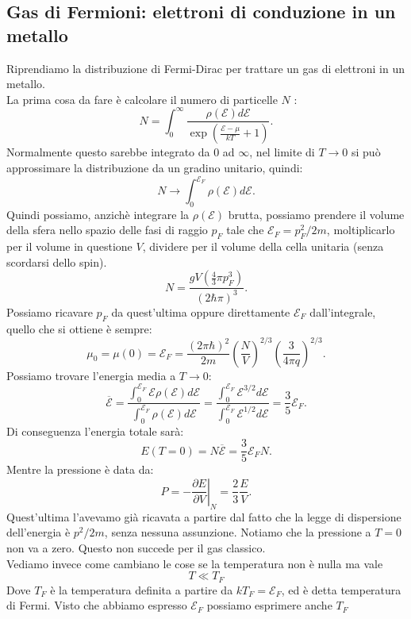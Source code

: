 \subsection{Gas di Fermioni: elettroni di conduzione in un metallo}%
Riprendiamo la distribuzione di Fermi-Dirac per trattare un gas di elettroni in un metallo.\\
La prima cosa da fare è calcolare il numero di particelle $N$ :
\[
	N = \int_{0}^{\infty} \frac{\rho ( \mathcal{E} ) d\mathcal{E} }{\exp\left( \frac{\mathcal{E} -\mu }{kT}+1 \right) }
.\] 
Normalmente questo sarebbe integrato da $0$ ad $\infty$, nel limite di $T \to 0$ si può approssimare la distribuzione da un gradino unitario, quindi:
\[
	N \to \int_{0}^{\mathcal{E} _{F}}  \rho ( \mathcal{E} ) d\mathcal{E}  
.\] 
Quindi possiamo, anzichè integrare la $\rho ( \mathcal{E} ) $ brutta, possiamo prendere il volume della sfera nello spazio delle fasi di raggio $p _{F}$ tale che $\mathcal{E} _{F} = p_{F}^2 /2m$, moltiplicarlo per il volume in questione $V$, dividere per il volume della cella unitaria (senza scordarsi dello spin).
\[
	N = \frac{g V \left( \frac{4}{3} \pi p_{F}^3 \right) }{\left( 2\hbar \pi \right) ^3} 
.\] 
Possiamo ricavare $p_{F}$ da quest'ultima oppure direttamente $\mathcal{E} _{F}$ dall'integrale, quello che si ottiene è sempre:
\[
	\mu _{0} = \mu ( 0) = \mathcal{E} _{F} = \frac{\left( 2\pi \hbar  \right) ^2}{2m} \left( \frac{N}{V} \right) ^{2 /3} \left( \frac{3}{4\pi q} \right) ^{2 /3}
.\]
Possiamo trovare l'energia media a $T\to 0$:
\[
	\overline{\mathcal{E} } = \frac{\int_{0}^{\mathcal{E} _{F}} \mathcal{E} \rho ( \mathcal{E} ) d\mathcal{E} }{\int_{0}^{\mathcal{E} _{F}} \rho ( \mathcal{E} ) d\mathcal{E}  }=
	\frac{\int_{0}^{\mathcal{E} _{F}} \mathcal{E} ^{3 /2}d\mathcal{E}  }{\int_{0}^{\mathcal{E} _{F}} \mathcal{E} ^{ 1/ 2}d \mathcal{E}  } = 
	\frac{3}{5} \mathcal{E} _{F}	
.\] 
Di conseguenza l'energia totale sarà:
\[
	E( T=0)  = N \overline{\mathcal{E} } = \frac{3}{5} \mathcal{E}_{F} N
.\] 
Mentre la pressione è data da:
\[
	P = - \left.\frac{\partial E}{\partial V} \right|_{N} = \frac{2}{3}\frac{E}{V}
.\] 
Quest'ultima l'avevamo già ricavata a partire dal fatto che la legge di dispersione dell'energia è $p^2/2m$, senza nessuna assunzione. Notiamo che la pressione a $T = 0$ non va a zero. Questo non succede per il gas classico.\\
Vediamo invece come cambiano le cose se la temperatura non è nulla ma vale 
\[
T \ll T_{F} 
\]
Dove $T_{F}$ è la temperatura definita a partire da $kT_{F} = \mathcal{E} _{F}$, ed è detta temperatura di Fermi. Visto che abbiamo espresso $\mathcal{E} _{F}$ possiamo esprimere anche $T_{F}$
